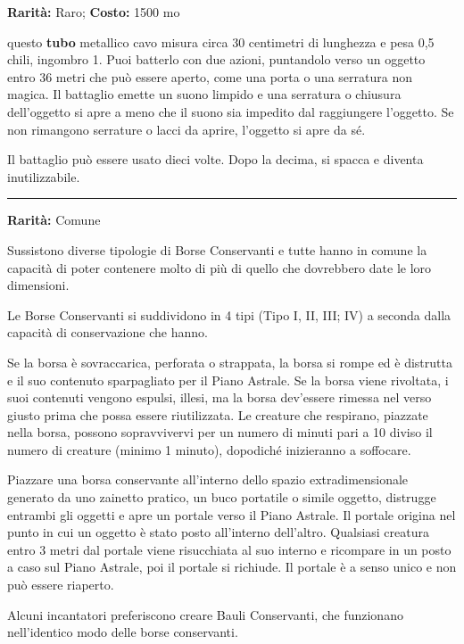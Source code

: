 \begin{multicols}{2}
\textbf{Rarità:} Raro; \textbf{Costo:} 1500 mo

questo \textbf{tubo} metallico cavo misura circa 30 centimetri di lunghezza e pesa 0,5 chili, ingombro 1. Puoi batterlo con due azioni, puntandolo verso un oggetto entro 36 metri che può essere aperto, come una porta o una serratura non magica. Il battaglio emette un suono limpido e una serratura o chiusura dell'oggetto si apre a meno che il suono sia impedito dal raggiungere l'oggetto. Se non rimangono serrature o lacci da aprire, l'oggetto si apre da sé.

Il battaglio può essere usato dieci volte. Dopo la decima, si spacca e diventa inutilizzabile.

\smallskip\noindent\rule{\linewidth}{2pt}  \hypertarget{BorsaConservante}{}\medskip{}\noindent\label{BorsaConservante}

\textbf{Rarità:} Comune



Sussistono diverse tipologie di Borse Conservanti e tutte hanno in comune la capacità di poter contenere molto di più di quello che dovrebbero date le loro dimensioni.

Le Borse Conservanti si suddividono in 4 tipi (Tipo I, II, III; IV) a seconda dalla capacità di conservazione che hanno.

Se la borsa è sovraccarica, perforata o strappata, la borsa si rompe ed è distrutta e il suo contenuto sparpagliato per il Piano Astrale. Se la borsa viene rivoltata, i suoi contenuti vengono espulsi, illesi, ma la borsa dev'essere rimessa nel verso giusto prima che possa essere riutilizzata. Le creature che respirano, piazzate nella borsa, possono sopravvivervi per un numero di minuti pari a 10 diviso il numero di creature (minimo 1 minuto), dopodiché inizieranno a soffocare.

Piazzare una borsa conservante all'interno dello spazio extradimensionale generato da uno zainetto pratico, un buco portatile o simile oggetto, distrugge entrambi gli oggetti e apre un portale verso il Piano Astrale. Il portale origina nel punto in cui un oggetto è stato posto all'interno dell'altro. Qualsiasi creatura entro 3 metri dal portale viene risucchiata al suo interno e ricompare in un posto a caso sul Piano Astrale, poi il portale si richiude. Il portale è a senso unico e non può essere riaperto.

Alcuni incantatori preferiscono creare Bauli Conservanti, che funzionano nell'identico modo delle borse conservanti.


\end{multicols}
